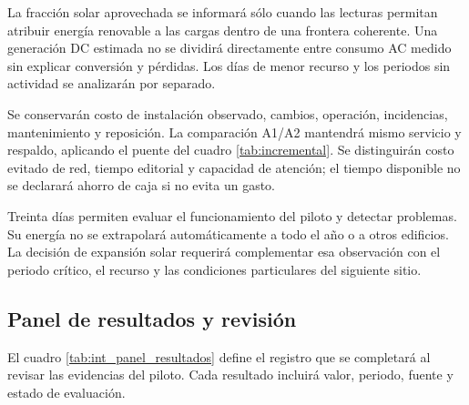 La fracción solar aprovechada se informará sólo cuando las lecturas permitan atribuir energía renovable a las cargas dentro de una frontera coherente. Una generación DC estimada no se dividirá directamente entre consumo AC medido sin explicar conversión y pérdidas. Los días de menor recurso y los periodos sin actividad se analizarán por separado.

Se conservarán costo de instalación observado, cambios, operación, incidencias, mantenimiento y reposición. La comparación A1/A2 mantendrá mismo servicio y respaldo, aplicando el puente del cuadro \ref{tab:incremental}. Se distinguirán costo evitado de red, tiempo editorial y capacidad de atención; el tiempo disponible no se declarará ahorro de caja si no evita un gasto.

Treinta días permiten evaluar el funcionamiento del piloto y detectar problemas. Su energía no se extrapolará automáticamente a todo el año o a otros edificios. La decisión de expansión solar requerirá complementar esa observación con el periodo crítico, el recurso y las condiciones particulares del siguiente sitio.

\subsection{Panel de resultados y revisión}
El cuadro \ref{tab:int_panel_resultados} define el registro que se completará al revisar las evidencias del piloto. Cada resultado incluirá valor, periodo, fuente y estado de evaluación.


